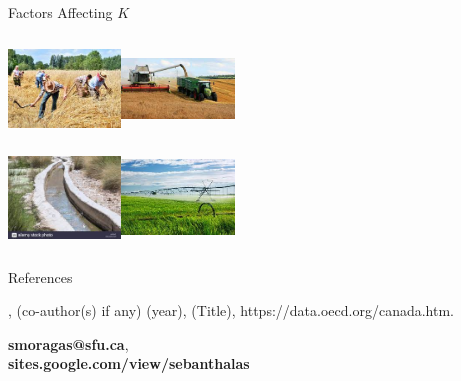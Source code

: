 \documentclass[t,9pt,aspectratio=169]{beamer}
\begin{document}
\begin{frame}{Factors Affecting $K$}

\begin{center}

 \includegraphics[width=3cm, height=2.75cm]{./figures/harvestOld}\includegraphics[width=3cm, height=2.75cm]{./figures/harvestNew}\\
 \includegraphics[width=3cm, height=2.75cm]{./figures/waterOld}\includegraphics[width=3cm, height=2.75cm]{./figures/waterNew}
 
\end{center}
 
\end{frame}


\begin{frame}
{References}
\begin{footnotesize}
\begin{thebibliography}{1}
,
(co-author(s) if any) (year), (Title), https://data.oecd.org/canada.htm. 
\end{thebibliography}
\end{footnotesize}
\vspace{0.5cm}

\begin{center}
\footnotesize {\textbf{smoragas@sfu.ca}}, \\
\footnotesize {\textbf{sites.google.com/view/sebanthalas}}
\end{center}

\end{frame}
\end{document}

